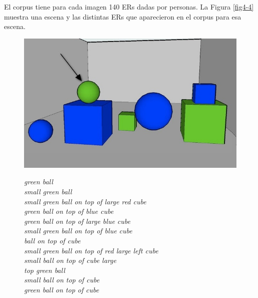 El corpus tiene para cada imagen 140 ERs dadas por personas. La Figura \ref{fig4-4} muestra una escena y las distintas ERs que aparecieron en el corpus para esa escena.
\begin{figure}[H]
\begin{minipage}[b]{0.5\linewidth}
\centering
\includegraphics[width=\textwidth]{images/3.jpg}
\end{minipage}
\hspace*{1cm}
\begin{minipage}[b]{0.5\linewidth}
\footnotesize{
{\it green ball} \\
{\it small green ball}  \\
{\it small green ball on top of large red cube} \\
{\it green ball on top of blue cube}\\
{\it green ball on top of large blue cube} \\
{\it small green ball on top of blue cube}  \\
{\it ball on top of cube} \\
{\it small green ball on top of red large left cube}  \\
{\it small ball on top of cube large}  \\
{\it top green ball}   \\
{\it small ball on top of cube } \\
{\it green ball on top of cube }

}
\end{minipage}
\end{figure}
